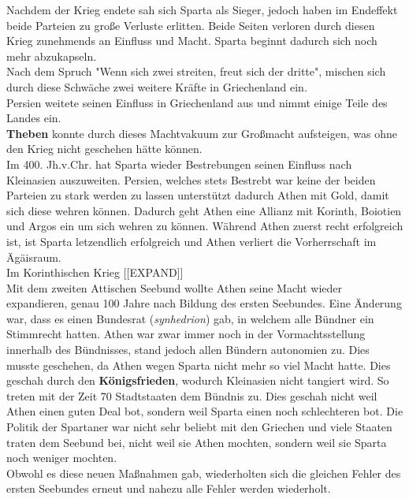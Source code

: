 \documentclass{article}
\begin{document}
	Nachdem der Krieg endete sah sich Sparta als Sieger, jedoch haben im Endeffekt beide Parteien zu große Verluste erlitten. Beide Seiten verloren durch diesen Krieg zunehmends an Einfluss und Macht. Sparta beginnt dadurch sich noch mehr abzukapseln. \\
	Nach dem Spruch "Wenn sich zwei streiten, freut sich der dritte", mischen sich durch diese Schwäche zwei weitere Kräfte in Griechenland ein. \\
	Persien weitete seinen Einfluss in Griechenland aus und nimmt einige Teile des Landes ein. \\
	\textbf{Theben} konnte durch dieses Machtvakuum zur Großmacht aufsteigen, was ohne den Krieg nicht geschehen hätte können. \\
	Im 400. Jh.v.Chr. hat Sparta wieder Bestrebungen seinen Einfluss nach Kleinasien auszuweiten. Persien, welches stets Bestrebt war keine der beiden Parteien zu stark werden zu lassen unterstützt dadurch Athen mit Gold, damit sich diese wehren können. Dadurch geht Athen eine Allianz mit Korinth, Boiotien und Argos ein um sich wehren zu können. Während Athen zuerst recht erfolgreich ist, ist Sparta letzendlich erfolgreich und Athen verliert die Vorherrschaft im Ägäisraum. \\
	Im Korinthischen Krieg [[EXPAND]] \\
	Mit dem zweiten Attischen Seebund wollte Athen seine Macht wieder expandieren, genau 100 Jahre nach Bildung des ersten Seebundes. Eine Änderung war, dass es einen Bundesrat (\textit{synhedrion}) gab, in welchem alle Bündner ein Stimmrecht hatten. Athen war zwar immer noch in der Vormachtsstellung innerhalb des Bündnisses, stand jedoch allen Bündern autonomien zu. Dies musste geschehen, da Athen wegen Sparta nicht mehr so viel Macht hatte. Dies geschah durch den \textbf{Königsfrieden}, wodurch Kleinasien nicht tangiert wird. So treten mit der Zeit 70 Stadtstaaten dem Bündnis zu. Dies geschah nicht weil Athen einen guten Deal bot, sondern weil Sparta einen noch schlechteren bot. Die Politik der Spartaner war nicht sehr beliebt mit den Griechen und viele Staaten traten dem Seebund bei, nicht weil sie Athen mochten, sondern weil sie Sparta noch weniger mochten. \\
	Obwohl es diese neuen Maßnahmen gab, wiederholten sich die gleichen Fehler des ersten Seebundes erneut und nahezu alle Fehler werden wiederholt. \\
\end{document}
